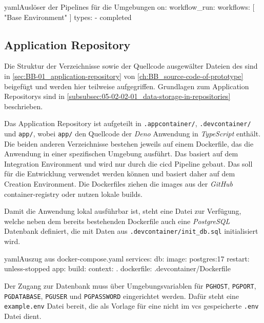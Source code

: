 \begin{codebox}{yaml}{Auslöser der Pipelines für die Umgebungen}
on:
    workflow_run:
        workflows: [ "Base Environment" ]
        types:
            - completed
\end{codebox}

\subsection{Application Repository}
\label{subsec:06-02-03_application-repository}

Die Struktur der Verzeichnisse sowie der Quellcode ausgewälter Dateien des  sind in \autoref{sec:BB-01_application-repository} von \autoref{ch:BB_source-code-of-prototype} beigefügt und werden hier teilweise aufgegriffen. Grundlagen zum Application Repositorys sind in \autoref{subsubsec:05-02-02-01_data-storage-in-repositories} beschrieben.

Das Application Repository ist aufgeteilt in \texttt{.appcontainer/}, \texttt{.devcontainer/} und \texttt{app/}, wobei \texttt{app/} den Quellcode der \textit{Deno} Anwendung in \textit{TypeScript} enthält. Die beiden anderen Verzeichnisse bestehen jeweils auf einem Dockerfile, das die Anwendung in einer spezifischen Umgebung ausführt. Das  basiert auf dem Integration Environment und wird nur durch die \Gls{cicd} Pipeline  gebaut. Das  soll für die Entwicklung verwendet werden können und basiert daher auf dem Creation Environment. Die Dockerfiles ziehen die \Glspl{image} aus der \textit{GitHub} \Gls{container-registry} oder nutzen lokale \Glspl{build}.

Damit die Anwendung lokal ausführbar ist, steht eine  Datei zur Verfügung, welche neben dem bereits bestehenden Dockerfile auch eine \textit{PostgreSQL} Datenbank definiert, die mit Daten aus \texttt{.devcontainer/init\_db.sql} initialisiert wird.

\begin{codebox}{yaml}{Auszug aus docker-compose.yaml}
services:
    db:
        image: postgres:17
        restart: unless-stopped
    app:
        build:
            context: .
            dockerfile: .devcontainer/Dockerfile
\end{codebox}

Der Zugang zur Datenbank muss über Umgebungsvariablen für \texttt{PGHOST}, \texttt{PGPORT}, \texttt{PGDATABASE}, \texttt{PGUSER} und \texttt{PGPASSWORD} eingerichtet werden. Dafür steht eine \texttt{example.env} Datei bereit, die als Vorlage für eine nicht im \Gls{vcs} gespeicherte \texttt{.env} Datei dient.

